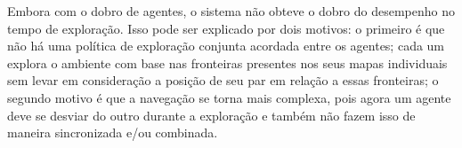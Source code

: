 Embora com o dobro de agentes, o sistema não obteve o dobro do 
desempenho no tempo de exploração. Isso pode ser explicado por dois motivos: o primeiro é que não há uma 
política de exploração conjunta acordada entre os agentes; cada um 
explora o ambiente com base nas fronteiras presentes nos seus mapas 
individuais sem levar em consideração a posição de seu par em relação 
a essas fronteiras; o segundo motivo é que a navegação se torna mais 
complexa, pois agora um agente deve se desviar do outro durante a 
exploração e também não fazem isso de maneira sincronizada e/ou combinada.




